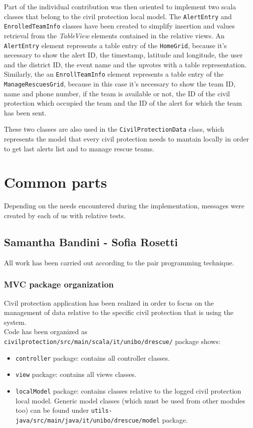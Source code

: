 \documentclass[a4paper,12pt]{report}
\begin{document}
Part of the individual contribution was then oriented to implement two scala classes that belong to the civil protection local model.
The \texttt{AlertEntry} and \texttt{EnrolledTeamInfo} classes have been created to simplify insertion and values retrieval from the \textit{TableView} elements contained in the relative views. An \texttt{AlertEntry} element represents a table entry of the \texttt{HomeGrid}, because it's necessary to show the alert ID, the timestamp, latitude and longitude, the user and the district ID, the event name and the upvotes with a table representation. Similarly, the an \texttt{EnrollTeamInfo} element represents a table entry of the \texttt{ManageRescuesGrid}, because in this case it's necessary to show the team ID, name and phone number, if the team is available or not, the ID of the civil protection which occupied the team and the ID of the alert for which the team has been sent.

These two classes are also used in the \texttt{CivilProtectionData} class, which represents the model that every civil protection needs to mantain locally in order to get last alerts list and to manage rescue teams.

\section{Common parts}
Depending on the needs encountered during the implementation, messages were created by each of us with relative tests.

\subsection{Samantha Bandini - Sofia Rosetti}
All work has been carried out according to the pair programming technique.

\subsubsection{MVC package organization}

Civil protection application has been realized in order to focus on the management of data relative to the specific civil protection that is using the system.\\

Code has been organized as \texttt{civilprotection/src/main/scala/it/unibo/drescue/} package shows: 

\begin{itemize}
\item \texttt{controller} package: contains all controller classes.
\item \texttt{view} package: contains all views classes.
\item \texttt{localModel} package: contains classes relative to the logged civil protection local model. Generic model classes (which must be used from other modules too) can be found under \texttt{utils-java/src/main/java/it/unibo/drescue/model} package.
\end{itemize} 
\end{document}

